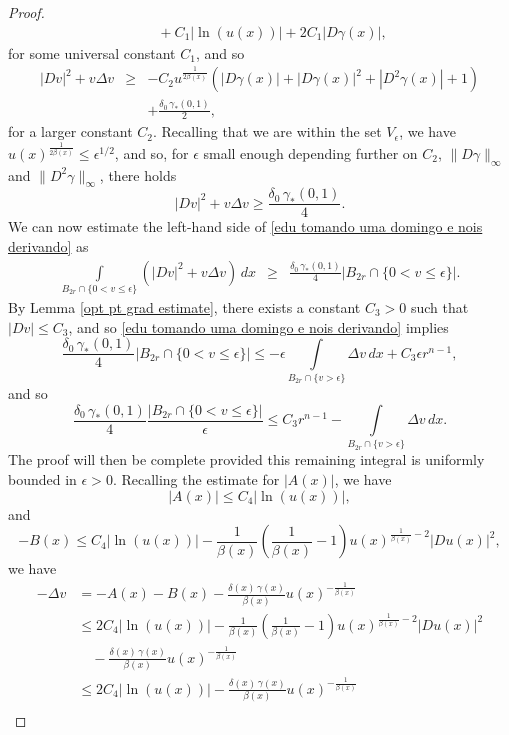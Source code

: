 \documentclass[reqno,11pt]{amsart}
\newcommand{\1}{\mathds{1}}
\numberwithin{equation}{section}
\begin{document}
\begin{proof}
\begin{align*}
	&  \quad + C_1|\ln(u(x))| + 2C_1 |D\gamma(x)|, 
\end{align*}
for some universal constant $C_1$, and so
\begin{eqnarray*}
         |Dv|^2 + v \Delta v & \geq & \displaystyle - C_2u^{\frac{1}{2\beta(x)}}\left(|D\gamma(x)| + |D\gamma(x)|^2 + |D^2\gamma(x)| + 1 \right)\\
         & &  + \frac{\delta_0 \, \gamma_\ast (0,1)}{2},
\end{eqnarray*}
for a larger constant $C_2$. Recalling that we are within the set $V_\epsilon$, we have $u(x)^{\frac{1}{2\beta(x)}} \leq \epsilon^{1/2}$, and so, for $\epsilon$ small enough depending further on $C_2$, $\|D\gamma\|_\infty$ and $\|D^2\gamma\|_\infty$, there holds
$$
	|Dv|^2 + v \Delta v \geq \frac{\delta_0 \, \gamma_\ast (0,1)}{4}.
$$
We can now estimate the left-hand side of \eqref{edu tomando uma domingo e nois derivando} as
\begin{eqnarray*}
         \int\limits_{B_{2r} \cap \{0 < v \leq \epsilon \} } \left(|Dv|^2 + v\Delta v\right)\,dx  & \geq &  \frac{\delta_0 \, \gamma_\ast (0,1)}{4}|B_{2r} \cap \{0 < v \leq \epsilon \}|.
\end{eqnarray*}
By Lemma \ref{opt pt grad estimate}, there exists a constant $C_3>0$ such that $|Dv| \leq C_3$, and so \eqref{edu tomando uma domingo e nois derivando} implies
$$
    \frac{\delta_0 \, \gamma_\ast (0,1)}{4}|B_{2r} \cap \{0 < v \leq \epsilon \}| \leq - \epsilon \int\limits_{B_{2r} \cap \{v > \epsilon \}}\Delta v\,dx + C_3 \epsilon r^{n-1},
$$
and so
$$
    \frac{\delta_0 \, \gamma_\ast (0,1)}{4}\frac{|B_{2r} \cap \{0 < v \leq \epsilon \}|}{\epsilon} \leq C_3r^{n-1} - \int\limits_{B_{2r} \cap \{v > \epsilon \}}\Delta v\,dx.
$$
The proof will then be complete provided this remaining integral is uniformly bounded in $\epsilon>0$. Recalling the estimate for $|A(x)|$, we have
$$
	|A(x)| \leq C_4|\ln(u(x))|,
$$
and 
$$
	-B(x) \leq C_4|\ln(u(x))| - \frac{1}{\beta(x)}\left(\frac{1}{\beta(x)} -1\right)u(x)^{\frac{1}{\beta(x)}-2}|Du(x)|^2,
$$
we have
\begin{align*}
        -\Delta v &  =   - A(x) - B(x) - \frac{\delta(x)\, \gamma(x)}{\beta(x)} u(x)^{-\frac{1}{\beta(x)}} \\
         & \leq   2C_4|\ln(u(x))| - \frac{1}{\beta(x)}\left(\frac{1}{\beta(x)} -1\right)u(x)^{\frac{1}{\beta(x)}-2}|Du(x)|^2 
         \\
         &  \quad - \frac{\delta(x)\, \gamma(x)}{\beta(x)} u(x)^{-\frac{1}{\beta(x)}}\\
         & \leq  2C_4|\ln(u(x))| - \frac{\delta(x)\, \gamma(x)}{\beta(x)} u(x)^{-\frac{1}{\beta(x)}}\\

\end{align*}
\end{proof}
\end{document}
